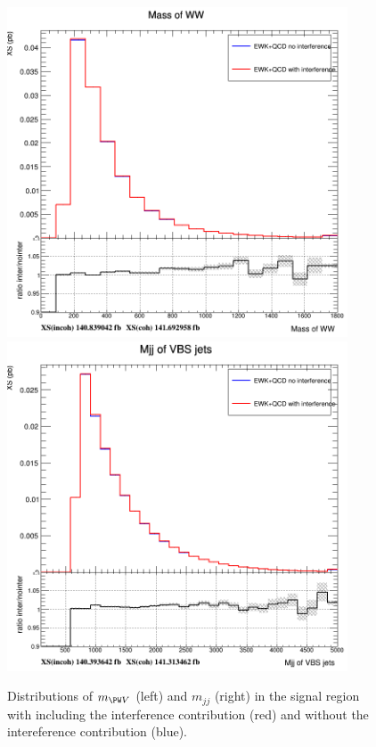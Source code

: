 \begin{figure}[htb]
\centering
\includegraphics[width=0.9\textwidth]{Plots/plots/interference_comparison_mww.png}
\includegraphics[width=0.9\textwidth]{Plots/plots/interference_comparison_mjj_vbs.png}
\caption{Distributions of $m_{\PW V}$ (left) and $m_{jj}$ (right) in the signal region with including the interference contribution (red) and without the intereference contribution (blue).}
\label{fig:interference}
\end{figure}


